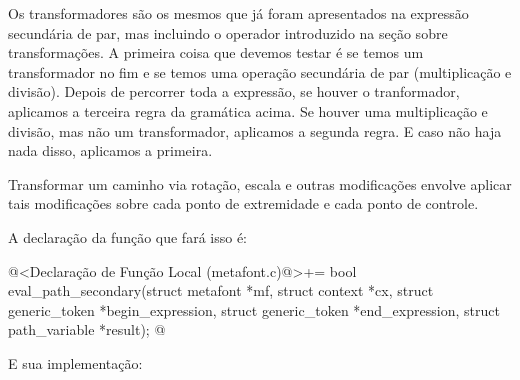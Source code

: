 {Os transformadores são os mesmos que já foram apresentados na
expressão secundária de par, mas incluindo o
operador  introduzido na seção sobre
transformações. A primeira coisa que devemos testar é se temos um
transformador no fim e se temos uma operação secundária de par
(multiplicação e divisão). Depois de percorrer toda a expressão, se
houver o tranformador, aplicamos a terceira regra da gramática
acima. Se houver uma multiplicação e divisão, mas não um
transformador, aplicamos a segunda regra. E caso não haja nada disso,
aplicamos a primeira.

Transformar um caminho via rotação, escala e outras modificações
envolve aplicar tais modificações sobre cada ponto de extremidade e
cada ponto de controle.

A declaração da função que fará isso é:

\iniciocodigo
@<Declaração de Função Local (metafont.c)@>+=
bool eval_path_secondary(struct metafont *mf, struct context *cx,
                        struct generic_token *begin_expression,
                        struct generic_token *end_expression,
                        struct path_variable *result);
@
\fimcodigo

E sua implementação:

}
